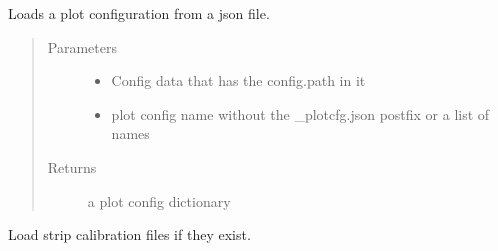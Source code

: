 \documentclass[letterpaper,10pt,english]{sphinxmanual}
\begin{document}

\begin{fulllineitems}
\label{\detokenize{autodocs/utils:listmode.utils.load_plot_config}}
\sphinxAtStartPar
Loads a plot configuration from a json file.
\begin{quote}\begin{description}
\item[{Parameters}] \leavevmode\begin{itemize}
\item {} 
\sphinxAtStartPar
{} \textendash{} Config data that has the config.path in it

\item {} 
\sphinxAtStartPar
{} \textendash{} plot config name without the \_plotcfg.json postfix or a list of names

\end{itemize}

\item[{Returns}] \leavevmode
\sphinxAtStartPar
a plot config dictionary

\end{description}\end{quote}

\end{fulllineitems}


\begin{fulllineitems}
\label{\detokenize{autodocs/utils:listmode.utils.load_strip_cal}}
\sphinxAtStartPar
Load strip calibration files if they exist.

\end{fulllineitems}

\end{document}
